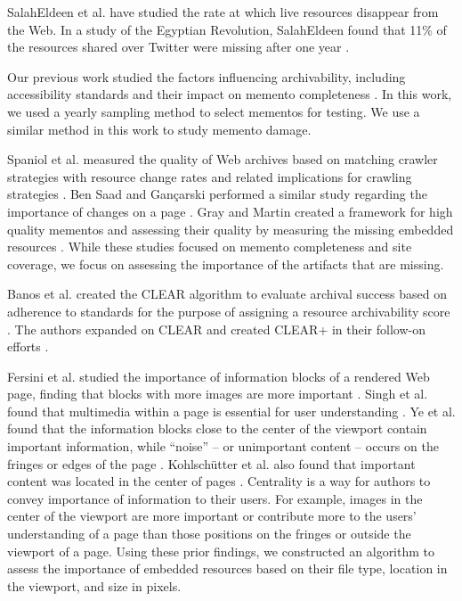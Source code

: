 SalahEldeen et al. have studied the rate at which live resources disappear from the Web. In a study of the Egyptian Revolution, SalahEldeen found that 11\% of the resources shared over Twitter were missing after one year \cite{losingmyrevolution, hanyTPDL2013}. %

Our previous work studied the factors influencing archivability, including accessibility standards and their impact on memento completeness \cite{kellyTPDL2013}. In this work, we used a yearly sampling method to select mementos for testing. We use a similar method in this work to study memento damage.

Spaniol et al. measured the quality of Web archives based on matching crawler strategies with resource change rates and related implications for crawling strategies \cite{spaniol9catch, spaniol2009data, Denev:2009:SFQ:1687627.1687694}. Ben Saad and Gan\c{c}arski performed a similar study regarding the importance of changes on a page \cite{saad2011, saadIJDL, saadTPDL}. Gray and Martin created a framework for high quality mementos and assessing their quality by measuring the missing embedded resources \cite{mementoQuality}. While these studies focused on memento completeness and site coverage, we focus on assessing the importance of the artifacts that are missing. 

Banos et al. created the CLEAR algorithm to evaluate archival success based on adherence to standards for the purpose of assigning a resource archivability score \cite{ipresArchivability}. The authors expanded on CLEAR and created CLEAR+ in their follow-on efforts \cite{clearIJDL}. 

Fersini et al. studied the importance of information blocks of a rendered Web page, finding that blocks with more images are more important \cite{Fersini20081431}. Singh et al. found that multimedia within a page is essential for user understanding \cite{Singh2009}. Ye et al. found that the information blocks close to the center of the viewport contain important information, while ``noise'' -- or unimportant content -- occurs on the fringes or edges of the page \cite{Yi2003}. Kohlsch\"{u}tter et al. also found that important content was located in the center of pages \cite{boilerPlate}. Centrality is a way for authors to convey importance of information to their users. For example, images in the center of the viewport are more important or contribute more to the users' understanding of a page than those positions on the fringes or outside the viewport of a page. Using these prior findings, we constructed an algorithm to assess the importance of embedded resources based on their file type, location in the viewport, and size in pixels.

